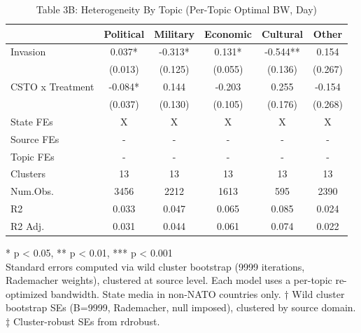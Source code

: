\begin{table}[!t]
\caption{Table 3B: Heterogeneity By Topic (Per-Topic Optimal BW, Day)} 
\fontsize{12.0pt}{14.4pt}\selectfont
\begin{tabular*}{\linewidth}{@{\extracolsep{\fill}}lccccc}
\toprule
  & Political & Military & Economic & Cultural & Other \\ 
\midrule\addlinespace[2.5pt]
Invasion & 0.037* & -0.313* & 0.131* & -0.544** & 0.154 \\ 
 & (0.013) & (0.125) & (0.055) & (0.136) & (0.267) \\ 
CSTO x Treatment & -0.084* & 0.144 & -0.203 & 0.255 & -0.154 \\ 
{} & {(0.037)} & {(0.130)} & {(0.105)} & {(0.176)} & {(0.268)} \\ 
State FEs & X & X & X & X & X \\ 
Source FEs & - & - & - & - & - \\ 
Topic FEs & - & - & - & - & - \\ 
Clusters & 13 & 13 & 13 & 13 & 13 \\ 
Num.Obs. & 3456 & 2212 & 1613 & 595 & 2390 \\ 
R2 & 0.033 & 0.047 & 0.065 & 0.085 & 0.024 \\ 
R2 Adj. & 0.031 & 0.044 & 0.061 & 0.074 & 0.022 \\ 
\bottomrule
\end{tabular*}
\begin{minipage}{\linewidth}
* p < 0.05, ** p < 0.01, *** p < 0.001\\
Standard errors computed via wild cluster bootstrap (9999 iterations, Rademacher
weights), clustered at source level. Each model uses a per-topic re-optimized
bandwidth. State media in non-NATO countries only. † Wild cluster bootstrap SEs
(B=9999, Rademacher, null imposed), clustered by source domain. ‡ Cluster-robust
SEs from rdrobust.\\
\end{minipage}
\end{table}

